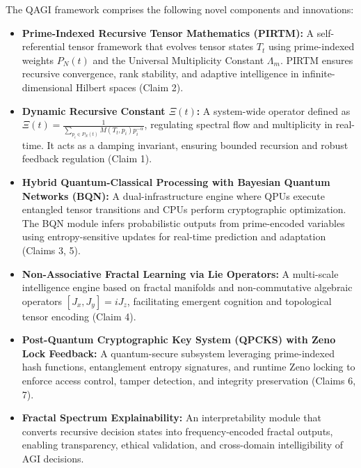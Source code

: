\documentclass{article}
\theoremstyle{plain}
\theoremstyle{claimstyle}
\begin{document}
The QAGI framework comprises the following novel components and innovations:

\begin{itemize}
    \item \textbf{Prime-Indexed Recursive Tensor Mathematics (PIRTM):} A self-referential tensor framework that evolves tensor states \( T_t \) using prime-indexed weights \( P_N(t) \) and the Universal Multiplicity Constant \( \Lambda_m \). PIRTM ensures recursive convergence, rank stability, and adaptive intelligence in infinite-dimensional Hilbert spaces (Claim 2).

    \item \textbf{Dynamic Recursive Constant \( \Xi(t) \):} A system-wide operator defined as \( \Xi(t) = \frac{1}{\sum_{p_i \in P_N(t)} M(T_t, p_i) p_i^{-\alpha}} \), regulating spectral flow and multiplicity in real-time. It acts as a damping invariant, ensuring bounded recursion and robust feedback regulation (Claim 1).

    \item \textbf{Hybrid Quantum-Classical Processing with Bayesian Quantum Networks (BQN):} A dual-infrastructure engine where QPUs execute entangled tensor transitions and CPUs perform cryptographic optimization. The BQN module infers probabilistic outputs from prime-encoded variables using entropy-sensitive updates for real-time prediction and adaptation (Claims 3, 5).

    \item \textbf{Non-Associative Fractal Learning via Lie Operators:} A multi-scale intelligence engine based on fractal manifolds and non-commutative algebraic operators \( [J_x, J_y] = iJ_z \), facilitating emergent cognition and topological tensor encoding (Claim 4).

    \item \textbf{Post-Quantum Cryptographic Key System (QPCKS) with Zeno Lock Feedback:} A quantum-secure subsystem leveraging prime-indexed hash functions, entanglement entropy signatures, and runtime Zeno locking to enforce access control, tamper detection, and integrity preservation (Claims 6, 7).

    \item \textbf{Fractal Spectrum Explainability:} An interpretability module that converts recursive decision states into frequency-encoded fractal outputs, enabling transparency, ethical validation, and cross-domain intelligibility of AGI decisions.
\end{itemize}
\end{document}
